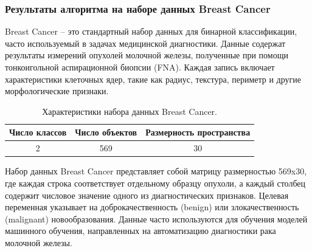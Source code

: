         \subsubsection{Результаты алгоритма на наборе данных Breast Cancer}
            Breast Cancer -- это стандартный набор данных для бинарной классификации, часто используемый в задачах медицинской диагностики. Данные содержат результаты измерений опухолей молочной железы, полученные при помощи тонкоигольной аспирационной биопсии (FNA). Каждая запись включает характеристики клеточных ядер, такие как радиус, текстура, периметр и другие морфологические признаки.

            \begin{table}[H]
                \centering
                \caption{Характеристики набора данных Breast Cancer.}
                \begin{tabular}{ccc}
                    \toprule
                    Число классов & Число объектов & Размерность пространства \\
                    \midrule
                    2 & 569 & 30 \\
                    \bottomrule
                \end{tabular}
            \end{table}

            Набор данных Breast Cancer представляет собой матрицу размерностью 569x30, где каждая строка соответствует отдельному образцу опухоли, а каждый столбец содержит числовое значение одного из диагностических признаков. Целевая переменная указывает на доброкачественность (benign) или злокачественность (malignant) новообразования. Данные часто используются для обучения моделей машинного обучения, направленных на автоматизацию диагностики рака молочной железы.

